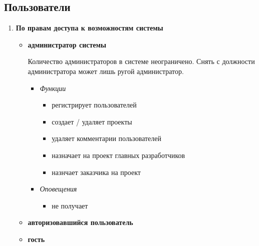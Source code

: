 \documentclass[14pt,a4paper]{extarticle}
\begin{document}
	\subsection {\bf Пользователи}
	\begin{enumerate}
		\item {\bf По правам доступа к возможностям системы}
		\begin{itemize}
			\item {\bf администратор системы}
			\par Количество администраторов в системе неограничено. Снять с должности администратора может лишь ругой администратор.
			\begin{itemize}
				\item {\it Функции}
				\begin{itemize}
					\item регистрирует пользователей
					\item создает / удаляет проекты
					\item удаляет комментарии пользователей
					\item назначает на проект главных разработчиков
					\item назнчает заказчика на проект
				\end{itemize}
				
				\item {\it Оповещения}
				\begin{itemize}
					\item не получает
				\end{itemize}
			\end{itemize}
			
			\item {\bf авторизовавшийся пользователь}
			
			\item {\bf гость}
			
		\end{itemize}
		

\end{enumerate}
\end{document}
